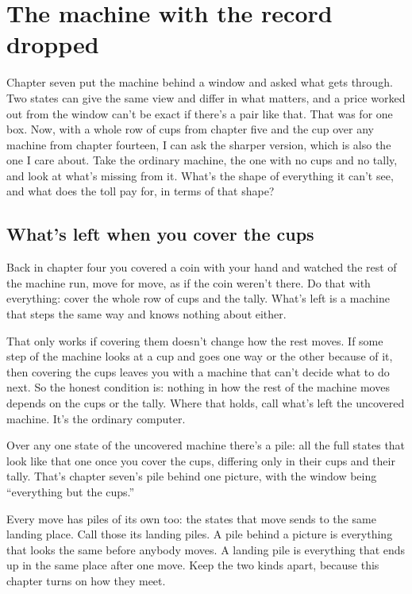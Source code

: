 \documentclass[11pt,twoside]{article}
\theoremstyle{thielethm}
\theoremstyle{thieledef}
\theoremstyle{thieledef}
\theoremstyle{thieledef}
\theoremstyle{thielethm}
\theoremstyle{thieleobs}
\theoremstyle{thielethm}
\begin{document}
\section{The machine with the record dropped}
\label{sec:dropped}

Chapter seven put the machine behind a window and asked what gets through. Two states can give the same view and differ in what matters, and a price worked out from the window can't be exact if there's a pair like that. That was for one box. Now, with a whole row of cups from chapter five and the cup over any machine from chapter fourteen, I can ask the sharper version, which is also the one I care about. Take the ordinary machine, the one with no cups and no tally, and look at what's missing from it. What's the shape of everything it can't see, and what does the toll pay for, in terms of that shape?

\subsection{What's left when you cover the cups}

Back in chapter four you covered a coin with your hand and watched the rest of the machine run, move for move, as if the coin weren't there. Do that with everything: cover the whole row of cups and the tally. What's left is a machine that steps the same way and knows nothing about either.

That only works if covering them doesn't change how the rest moves. If some step of the machine looks at a cup and goes one way or the other because of it, then covering the cups leaves you with a machine that can't decide what to do next. So the honest condition is: nothing in how the rest of the machine moves depends on the cups or the tally. Where that holds, call what's left the uncovered machine. It's the ordinary computer.

Over any one state of the uncovered machine there's a pile: all the full states that look like that one once you cover the cups, differing only in their cups and their tally. That's chapter seven's pile behind one picture, with the window being ``everything but the cups.''

Every move has piles of its own too: the states that move sends to the same landing place. Call those its landing piles. A pile behind a picture is everything that looks the same before anybody moves. A landing pile is everything that ends up in the same place after one move. Keep the two kinds apart, because this chapter turns on how they meet.
\end{document}
